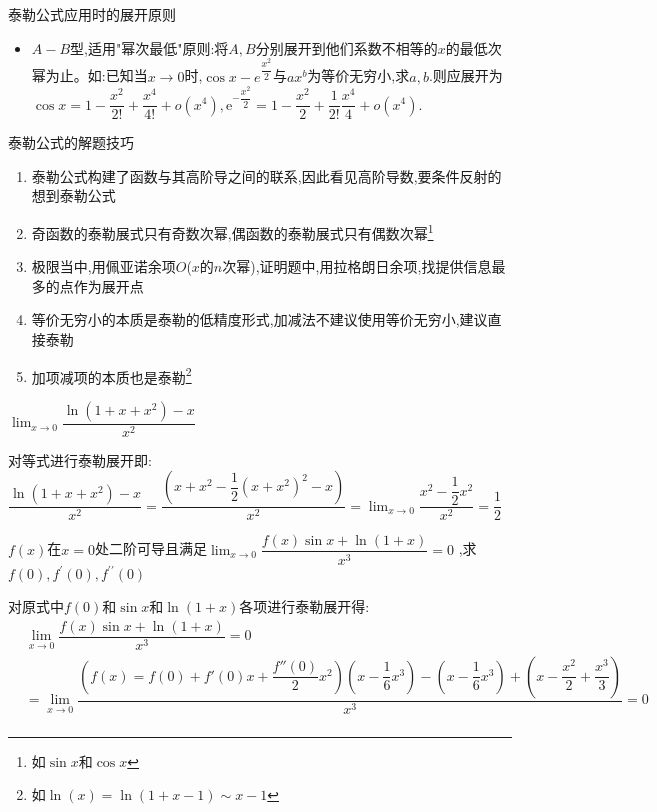 \documentclass[10pt, a4paper, oneside, UTF8]{ctexbook}
\begin{document}
\begin{sloppypar}
\begin{criterion}{泰勒公式应用时的展开原则}{}
\begin{itemize}
            \item $A-B$型,适用"幂次最低"原则:将$A,B$分别展开到他们系数不相等的$x$的最低次幂为止。如:已知当$x\to0$时,$\cos x-e^{\dfrac{x^2}2}$与$ax^b$为等价无穷小,求$a,b$.则应展开为$\cos x=1-\dfrac{x^2}{2!}+\dfrac{x^4}{4!}+o(x^4),\mathrm{e}^{-\dfrac{x^2}{2}}=1-\dfrac{x^2}{2}+\dfrac{1}{2!}\dfrac{x^4}{4}+o(x^4).$
        \end{itemize}
    \end{criterion}
    \begin{criterion}{泰勒公式的解题技巧}{}
        \begin{enumerate}
            \item 泰勒公式构建了函数与其高阶导之间的联系,因此看见高阶导数,要条件反射的想到泰勒公式
            \item 奇函数的泰勒展式只有奇数次幂,偶函数的泰勒展式只有偶数次幂\footnote{如$\sin x$和$\cos x$}
            \item 极限当中,用佩亚诺余项$O$($x$的$n$次幂),证明题中,用拉格朗日余项,找提供信息最多的点作为展开点
            \item 等价无穷小的本质是泰勒的低精度形式,加减法不建议使用等价无穷小,建议直接泰勒
            \item 加项减项的本质也是泰勒\footnote{如$\ln(x)=\ln(1+x-1)\sim x-1$}
        \end{enumerate}
    \end{criterion}
    \begin{problem}
        $\lim_{x\to0}\dfrac{\ln\left(1+x+x^{2}\right)-x}{x^{2}}$
    \end{problem}
    \begin{solution}
        对等式进行泰勒展开即:\\$\dfrac{\ln(1+x+x^2)-x}{x^2}=\dfrac{(x+x^2-\dfrac{1}{2}(x+x^2)^2-x)}{x^2}=\lim_{x \to 0}\dfrac{x^2-\dfrac{1}{2}x^2}{x^2}=\dfrac{1}{2}$
    \end{solution}
    \begin{problem}
        $f(x)$在$x=0$处二阶可导且满足$\lim_{x\to 0}\dfrac{f(x)\sin x+\ln(1+x)}{x^3}=0$ ,求$f(0),f^{\prime}(0),f^{\prime\prime}(0)$
    \end{problem}
    \begin{solution}
        对原式中$f(0)$和$\sin x$和$\ln(1+x)$各项进行泰勒展开得:
    \begin{equation*}
        \begin{split}    
            & \lim_{x\to 0}\dfrac{f(x)\sin x+\ln(1+x)}{x^3}=0 \\
            & = \lim_{x \to 0}\dfrac{(f(x)=f(0)+f'(0)x+\dfrac{f''(0)}{2}x^2)(x-\dfrac{1}{6}x^3)-(x-\dfrac{1}{6}x^3)+(x-\dfrac{x^2}{2}+\dfrac{x^3}{3})}{x^3}=0 \\

\end{split}
\end{equation*}
\end{solution}
\end{sloppypar}
\end{document}
